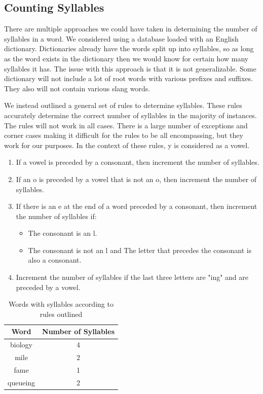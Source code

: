 \documentclass[]{article}
\begin{document}
\subsection{Counting Syllables}
There are multiple approaches we could have taken in determining the number of syllables in a word. We considered using a database loaded with an English dictionary. Dictionaries already have the words split up into syllables, so as long as the word exists in the dictionary then we would know for certain how many syllables it has. The issue with this approach is that it is not generalizable. Some dictionary will not include a lot of root words with various prefixes and suffixes. They also will not contain various slang words.

We instead outlined a general set of rules to determine syllables. These rules accurately determine the correct number of syllables in the majority of instances. The rules will not work in all cases. There is a large number of exceptions and corner cases making it difficult for the rules to be all encompassing, but they work for our purposes. In the context of these rules, y is considered as a vowel.
\begin{enumerate}
	\item If a vowel is preceded by a consonant, then increment the number of syllables.
	\item If an o is preceded by a vowel that is not an o, then increment the number of syllables.
	\item If there is an e at the end of a word preceded by a consonant, then increment the number of syllables if:
	\begin{itemize}
		\item The consonant is an l.
		\item The consonant is not an l and The letter that precedes the consonant is also a consonant.
	\end{itemize}
	\item Increment the number of syllables if the last three letters are "ing" and are preceded by a vowel.
\end{enumerate}

\begin{table}[H]
\begin{center}
	\begin{tabular}{| c | c |}
		\hline
		Word & Number of Syllables \\
		\hline
		biology & 4 \\
		\hline
		mile & 2 \\
		\hline
		fame & 1 \\
		\hline
		queueing & 2 \\
		\hline
	\end{tabular}
\caption{Words with syllables according to rules outlined}
\label{table:syllables}
\end{center}
\end{table}
\end{document}

